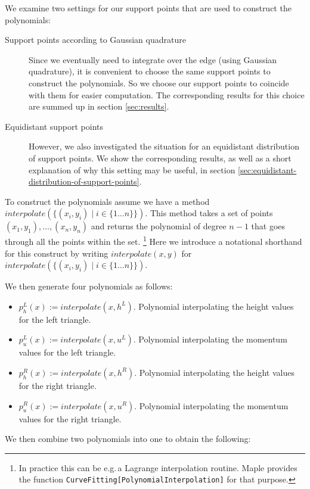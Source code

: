 \documentclass{article}
\begin{document}
We examine two settings for our support points that are used to construct the polynomials:

\begin{description}
\item[Support points according to Gaussian quadrature] Since we eventually need to integrate over the edge (using Gaussian quadrature), it is convenient to choose the same support points to construct the polynomials. So we choose our support points to coincide with them for easier computation. The corresponding results for this choice are summed up in section \ref{sec:results}.
\item[Equidistant support points] However, we also investigated the situation for an equidistant distribution of support points. We show the corresponding results, as well as a short explanation of why this setting may be useful, in section \ref{sec:equidistant-distribution-of-support-points}.
\end{description}

To construct the polynomials assume we have a method $interpolate\left(\{\left(x_i,y_i\right) \mid i \in \{1 \dots n\}\}\right)$.
This method takes a set of points $\left(x_1,y_1\right),\dots,\left(x_n,y_n\right)$ and returns the polynomial of degree $n-1$ that goes through all the points within the set.
\footnote{In practice this can be e.g.\,a Lagrange interpolation routine. Maple provides the function \texttt{CurveFitting[PolynomialInterpolation]} for that purpose.}
Here we introduce a notational shorthand for this construct by writing $interpolate\left(x,y\right)$ for $interpolate\left(\{\left(x_i,y_i\right) \mid i \in \{1 \dots n\}\}\right)$.

We then generate four polynomials as follows:

\begin{itemize}
\item $p^L_h(x) := interpolate (x,h^L)$. Polynomial interpolating the height values for the left triangle.
\item $p^L_u(x) := interpolate (x,u^L)$. Polynomial interpolating the momentum values for the left triangle.
\item $p^R_h(x) := interpolate (x,h^R)$. Polynomial interpolating the height values for the right triangle.
\item $p^R_u(x) := interpolate (x,u^R)$. Polynomial interpolating the momentum values for the right triangle.
\end{itemize}

We then combine two polynomials into one to obtain the following:
\end{document}
